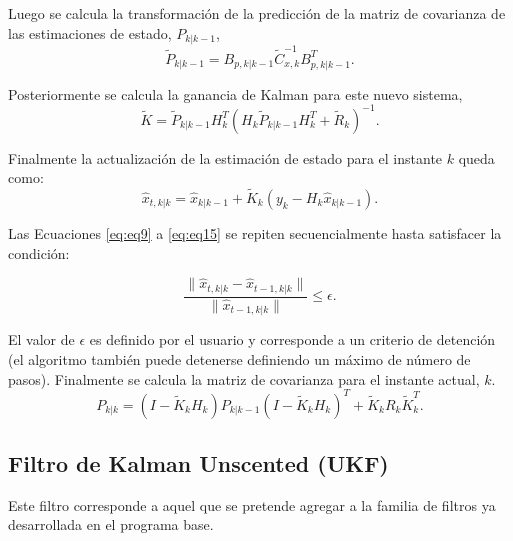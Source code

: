 Luego se calcula la transformaci\'on de la predicci\'on de la matriz de covarianza de las estimaciones de estado, $P_{k|k-1}$,
\begin{equation}
\tilde{P}_{k|k-1} = B_{p, k|k-1} \tilde{C}_{x, k}^{-1}B_{p, k|k-1}^T.
\label{eq:eq13}
\end{equation}

Posteriormente se calcula la ganancia de Kalman para este nuevo sistema,
\begin{equation}
\tilde{K} = \tilde{P}_{k|k-1} H_k^T (H_k \tilde{P}_{k|k-1} H_k^T + \tilde{R}_k)^{-1}. 
\label{eq:eq14}
\end{equation}

Finalmente la actualizaci\'on de la estimaci\'on de estado para el instante $k$ queda como: 
\begin{equation}
\hat{x}_{t, k|k} = \hat{x}_{k|k-1} + \tilde{K}_{k} (y_k - H_k \hat{x}_{k|k-1}).
\label{eq:eq15}
\end{equation}
\bigskip

Las Ecuaciones \ref{eq:eq9} a \ref{eq:eq15} se repiten secuencialmente hasta satisfacer la condici\'on:

\begin{equation}
\dfrac{\parallel  \hat{x}_{t, k|k} - \hat{x}_{t-1, k|k} \parallel }{\parallel \hat{x}_{t-1, k|k} \parallel} \leq \epsilon.
\label{eq:eq16}
\end{equation}

El valor de $\epsilon$ es definido por el usuario y corresponde a un criterio de detenci\'on (el algoritmo tambi\'en puede detenerse definiendo un m\'aximo de n\'umero de pasos). Finalmente se calcula la matriz de covarianza para el instante actual, $k$.
\begin{equation}
P_{k|k} = \left(I - \tilde{K}_kH_k \right)P_{k|k-1} \left(I - \tilde{K}_k H_k \right)^T + \tilde{K}_kR_k\tilde{K}^T_k.
\label{eq:eq17}
\end{equation}

\subsection{Filtro de Kalman Unscented (UKF)}
\label{ssec:ukf}
Este filtro corresponde a aquel que se pretende agregar a la familia de filtros ya desarrollada en el programa base.
\bigskip

